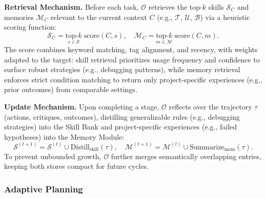 \documentclass{opendatalab}
\begin{document}
\noindent\textbf{Retrieval Mechanism.}
Before each task, $\mathcal{O}$ retrieves the top-$k$ skills $\mathcal{S}_C$ and memories $\mathcal{M}_C$ relevant to the current context $C$ (e.g., $\mathcal{T}$, $\mathcal{U}$, $\mathcal{B}$) via a heuristic scoring function:
\begin{equation}
    \mathcal{S}_C = \underset{s \in \mathcal{S}}{\text{top-}k}\;\text{score}(C, s), \quad \mathcal{M}_C = \underset{m \in \mathcal{M}}{\text{top-}k}\;\text{score}(C, m).
\end{equation}
The score combines keyword matching, tag alignment, and recency, with weights adapted to the target: skill retrieval prioritizes usage frequency and confidence to surface robust strategies (e.g., debugging patterns), while memory retrieval enforces strict condition matching to return only project-specific experiences (e.g., prior outcomes) from comparable settings.

\noindent\textbf{Update Mechanism.}
Upon completing a stage, $\mathcal{O}$ reflects over the trajectory $\tau$ (actions, critiques, outcomes), distilling generalizable rules (e.g., debugging strategies) into the Skill Bank and project-specific experiences (e.g., failed hypotheses) into the Memory Module:
\begin{equation}
    \mathcal{S}^{(t+1)} = \mathcal{S}^{(t)} \cup \text{Distill}_{\text{skill}}(\tau), \quad \mathcal{M}^{(t+1)} = \mathcal{M}^{(t)} \cup \text{Summarize}_{\text{mem}}(\tau).
\end{equation}
To prevent unbounded growth, $\mathcal{O}$ further merges semantically overlapping entries, keeping both stores compact for future cycles.

\subsubsection{Adaptive Planning}
\end{document}
